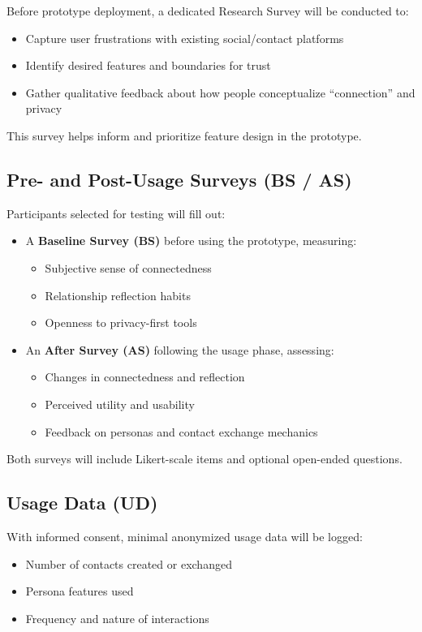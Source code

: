 \documentclass{imc-inf}
\begin{document}
Before prototype deployment, a dedicated Research Survey will be conducted to:
\begin{itemize}
  \item Capture user frustrations with existing social/contact platforms
  \item Identify desired features and boundaries for trust
  \item Gather qualitative feedback about how people conceptualize “connection” and privacy
\end{itemize}
This survey helps inform and prioritize feature design in the prototype.

\subsection{Pre- and Post-Usage Surveys (BS / AS)}

Participants selected for testing will fill out:
\begin{itemize}
  \item A \textbf{Baseline Survey (BS)} before using the prototype, measuring:
    \begin{itemize}
      \item Subjective sense of connectedness
      \item Relationship reflection habits
      \item Openness to privacy-first tools
    \end{itemize}
  \item An \textbf{After Survey (AS)} following the usage phase, assessing:
    \begin{itemize}
      \item Changes in connectedness and reflection
      \item Perceived utility and usability
      \item Feedback on personas and contact exchange mechanics
    \end{itemize}
\end{itemize}

Both surveys will include Likert-scale items and optional open-ended questions.

\subsection{Usage Data (UD)}

With informed consent, minimal anonymized usage data will be logged:
\begin{itemize}
  \item Number of contacts created or exchanged
  \item Persona features used
  \item Frequency and nature of interactions
\end{itemize}
\end{document}
